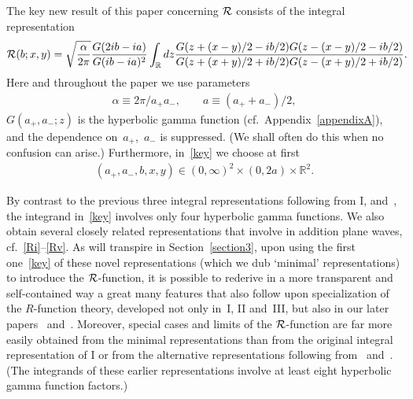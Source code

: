 \documentclass[11pt]{article}
\numberwithin{equation}{section}
\newcommand{\R}{{\mathbb R}}
\newcommand{\cR}{{\cal R}}
\newcommand{\aaa}{a_{+},a_{-}}
\begin{document}
The key new result of this paper concerning $\cR$ consists of the integral representation
\begin{gather}\label{key}
\cR(b;x,y)=\sqrt{\frac{\alpha}{2\pi}}\frac{G(2ib-ia)}{G(ib-ia)^2}\int_{\R}dz \frac{G(z+ (x-y)/2-ib/2)G(z- (x-y)/2-ib/2)}{G(z+ (x+y)/2+ib/2)G(z- (x+y)/2+ib/2)}.
\!\!\!
\end{gather}
Here and throughout the paper we use parameters
\begin{gather}\label{aconv}
\alpha\equiv 2\pi/a_+a_-,\qquad a\equiv (a_++a_-)/2,
\end{gather}
$G(\aaa;z)$ is the hyperbolic gamma function (cf.~Appendix~\ref{appendixA}), and  the dependence on~$a_{+}$,~$a_{-}$ is suppressed. (We shall often do this when no confusion can arise.) Furthermore, in~\eqref{key} we choose at f\/irst
\begin{gather}\label{first}
(\aaa,b,x,y)\in(0,\infty)^2\times(0,2a)\times\R^2.
\end{gather}

By contrast to the previous three integral representations following from I, \cite{bult} and~\cite{bust}, the integrand in~\eqref{key}
involves only four hyperbolic gamma functions. We also obtain several closely related representations that involve in addition plane waves, cf.~\eqref{Ri}--\eqref{Rv}. As will transpire in Section~\ref{section3}, upon using the f\/irst one~\eqref{key} of these novel representations (which we dub `minimal' representations) to introduce the $\cR$-function, it is possible to rederive in a more transparent and self-contained way a great many features that also follow upon specialization of the $R$-function theory, developed not only in~I, II and~III, but also in our later papers~\cite{anne} and~\cite{quad}. Moreover, special cases and limits of the $\cR$-function are far more easily obtained from the minimal representations than from the original integral representation of I or from the alternative representations following from~\cite{bult} and~\cite{bust}. (The integrands of these earlier representations involve at least eight hyperbolic gamma function factors.)
\end{document}
